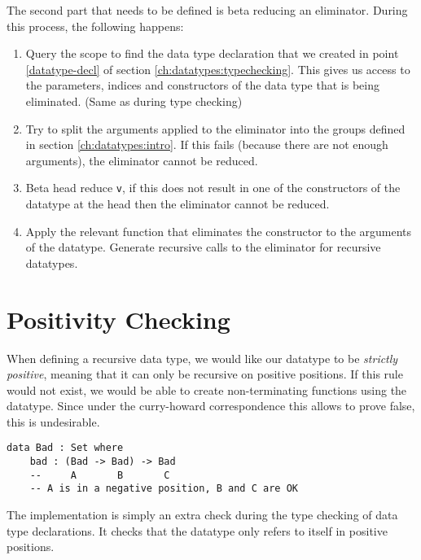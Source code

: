 The second part that needs to be defined is beta reducing an eliminator. During this process, the following happens:
\begin{enumerate}
	\item Query the scope to find the data type declaration that we created in point \ref{datatype-decl} of section \ref{ch:datatypes:typechecking}. This gives us access to the parameters, indices and constructors of the data type that is being eliminated. (Same as during type checking)
	\item Try to split the arguments applied to the eliminator into the groups defined in section \ref{ch:datatypes:intro}. If this fails (because there are not enough arguments), the eliminator cannot be reduced.
	\item Beta head reduce \verb|v|, if this does not result in one of the constructors of the datatype at the head then the eliminator cannot be reduced. 
	\item Apply the relevant function that eliminates the constructor to the arguments of the datatype. Generate recursive calls to the eliminator for recursive datatypes.
\end{enumerate}

\section{Positivity Checking}
\label{ch:datatypes:positivity}
	
When defining a recursive data type, we would like our datatype to be \emph{strictly positive}, meaning that it can only be recursive on positive positions. If this rule would not exist, we would be able to create non-terminating functions using the datatype. Since under the curry-howard correspondence this allows to prove false, this is undesirable.

\begin{lstlisting}
data Bad : Set where
	bad : (Bad -> Bad) -> Bad
	--     A       B       C
	-- A is in a negative position, B and C are OK
\end{lstlisting}

The implementation is simply an extra check during the type checking of data type declarations. It checks that the datatype only refers to itself in positive positions.
